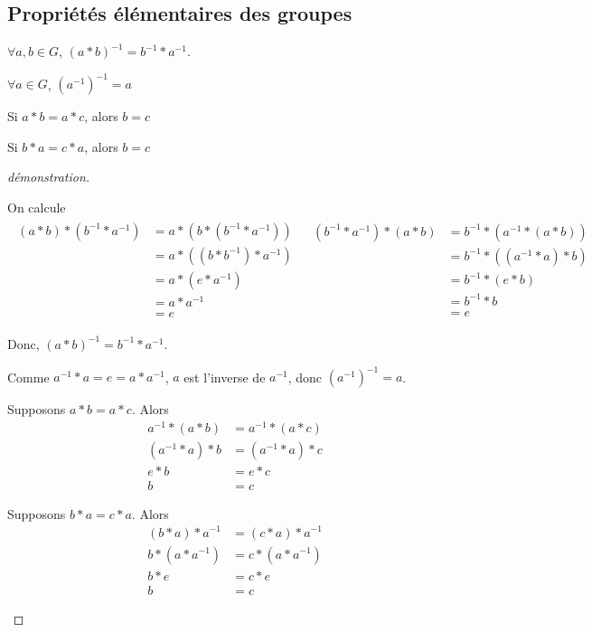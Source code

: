 \documentclass{report}
\theoremstyle{definition}
\theoremstyle{remark}
\begin{document}
	\subsection{Propri\'et\'es \'el\'ementaires des groupes}
	\begin{nlist}
		\item $\forall a,b \in G$, $(a*b)^{-1} = b^{-1}*a^{-1}$.
		\item $\forall a \in G$, $(a^{-1})^{-1}=a$
		\item Si $a*b=a*c$, alors $b=c$
		\item Si $b*a=c*a$, alors $b=c$
	\end{nlist}
	\begin{proof}[d\'emonstration]~

		\begin{nlist}
			\item On calcule
			\begin{align*}
				\begin{split}
					(a*b)*(b^{-1}*a^{-1})&= a*(b*(b^{-1}*a^{-1}))\\
					&= a*((b*b^{-1})*a^{-1})\\
					&= a*(e*a^{-1})\\
					&= a*a^{-1}\\
					&= e
				\end{split}
				&
				\begin{split}
					(b^{-1}*a^{-1})*(a*b)&= b^{-1}*(a^{-1}*(a*b))\\
					&= b^{-1}*((a^{-1}*a)*b)\\
					&= b^{-1}*(e*b)\\
					&= b^{-1}*b\\
					&= e
				\end{split}
			\end{align*}

			Donc, $(a*b)^{-1} = b^{-1}*a^{-1}$.
			\item Comme $a^{-1}*a=e=a*a^{-1}$, $a$ est l'inverse de $a^{-1}$, donc $\left( a^{-1} \right)^{-1}=a$.
			\item Supposons $a*b=a*c$. Alors
			\begin{align*}
				a^{-1}*(a*b)&= a^{-1}*(a*c)\\
				(a^{-1}*a)*b&= (a^{-1}*a)*c\\
				e*b&= e*c\\
				b&= c
			\end{align*}
			\item Supposons $b*a=c*a$. Alors
			\begin{align*}
				(b*a)*a^{-1}&= (c*a)*a^{-1}\\
				b*(a*a^{-1})&= c*(a*a^{-1})\\
				b*e&= c*e\\
				b&= c
			\end{align*}
		\end{nlist}
	\end{proof}
\end{document}
